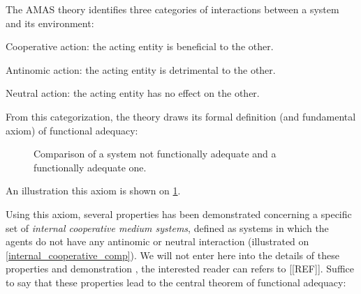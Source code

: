 The AMAS theory identifies three categories of interactions between a system and its environment:
\begin{compactitem}
\item Cooperative action: the acting entity is beneficial to the other.
\item Antinomic action: the acting entity is detrimental to the other.
\item Neutral action: the acting entity has no effect on the other.
\end{compactitem}

From this categorization, the theory draws its formal definition (and fundamental axiom) of functional adequacy:


\begin{figure}
\centering
{}
\hfill
{}

\caption{Comparison of a system not functionally adequate and a functionally adequate one.}
\label{adequacy_comp}
\end{figure}

An illustration this axiom is shown on \figurename{} \ref{adequacy_comp}.


Using this axiom, several properties has been demonstrated concerning a specific set of \emph{internal cooperative medium systems}, defined as systems in which the agents do not have any antinomic or neutral interaction (illustrated on \figurename{} \ref{internal_cooperative_comp}). We will not enter here into the details of these properties and demonstration
, the interested reader can refers to [[REF]]. Suffice to say that these properties lead to the central theorem of functional adequacy:


